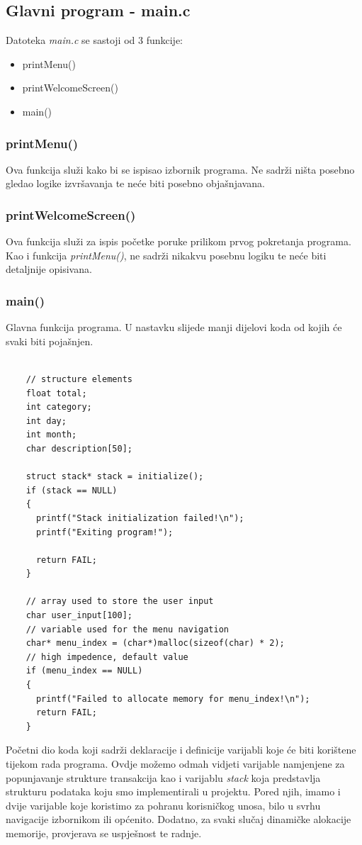 \documentclass[12pt, letterpaper]{article}
\begin{document}
  \subsection{Glavni program - main.c}
  Datoteka \textit{main.c} se sastoji od 3 funkcije:
  \begin{itemize}
    \item printMenu()
    \item printWelcomeScreen()
    \item main()
  \end{itemize}

  \subsubsection{printMenu()}
    Ova funkcija služi kako bi se ispisao izbornik programa. Ne sadrži ništa posebno gledao logike izvršavanja te neće biti posebno objašnjavana. 

  \subsubsection{printWelcomeScreen()}
    Ova funkcija služi za ispis početke poruke prilikom prvog pokretanja programa. Kao i funkcija \textit{printMenu()}, ne sadrži nikakvu posebnu logiku te neće biti detaljnije opisivana.

  \subsubsection{main()}
    Glavna funkcija programa. U nastavku slijede manji dijelovi koda od kojih će svaki biti pojašnjen.
    \begin{verbatim}

    // structure elements
    float total;
    int category;
    int day;
    int month;
    char description[50];

    struct stack* stack = initialize();
    if (stack == NULL)
    {
      printf("Stack initialization failed!\n");
      printf("Exiting program!");

      return FAIL;
    }

    // array used to store the user input
    char user_input[100];
    // variable used for the menu navigation
    char* menu_index = (char*)malloc(sizeof(char) * 2); 
    // high impedence, default value
    if (menu_index == NULL)
    {
      printf("Failed to allocate memory for menu_index!\n");
      return FAIL;
    }   
    \end{verbatim}
    Početni dio koda koji sadrži deklaracije i definicije varijabli koje će biti korištene tijekom rada programa. Ovdje možemo odmah vidjeti varijable namjenjene za popunjavanje strukture transakcija kao i varijablu \textit{stack} koja predstavlja strukturu podataka koju smo implementirali u projektu. Pored njih, imamo i dvije varijable koje koristimo za pohranu korisničkog unosa, bilo u svrhu navigacije izbornikom ili općenito. Dodatno, za svaki slučaj dinamičke alokacije memorije, provjerava se uspješnost te radnje.
\end{document}
